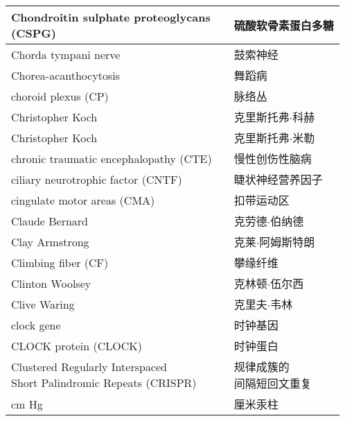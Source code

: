 \begin{longtable}{lll}
	\midrule
	\makecell[l]{Chondroitin sulphate proteoglycans \\(CSPG)} && 硫酸软骨素蛋白多糖  \\
	
	\midrule
	Chorda tympani nerve   && 鼓索神经  \\
	
	\midrule
	Chorea-acanthocytosis   && 舞蹈病  \\
	
	\midrule
	choroid plexus (CP)   && 脉络丛  \\
	
	\midrule
	Christopher Koch   && 克里斯托弗$\cdot$科赫  \\
	
	\midrule
	Christopher Koch   && 克里斯托弗$\cdot$米勒  \\
	
	\midrule
	chronic traumatic encephalopathy (CTE)   && 慢性创伤性脑病  \\
	
	\midrule
	ciliary neurotrophic factor (CNTF)  && 睫状神经营养因子  \\
	
	\midrule
	cingulate motor areas (CMA)   && 扣带运动区  \\
	
	\midrule
	Claude Bernard   && 克劳德$\cdot$伯纳德  \\
	
	\midrule
	Clay Armstrong   && 克莱$\cdot$阿姆斯特朗  \\
	
	\midrule
	Climbing fiber (CF)  && 攀缘纤维  \\
	
	\midrule
	Clinton Woolsey  && 克林顿$\cdot$伍尔西  \\
	
	\midrule
	Clive Waring   && 克里夫$\cdot$韦林  \\
	
	\midrule
	clock gene   && 时钟基因  \\
	
	\midrule
	CLOCK protein (CLOCK)  && 时钟蛋白  \\
	
	\midrule
	\makecell[l]{Clustered Regularly Interspaced\\ Short Palindromic Repeats (CRISPR)}  && \makecell[l]{规律成簇的\\间隔短回文重复}  \\
	
	\midrule
	cm Hg  && 厘米汞柱  \\
	

\end{longtable}
